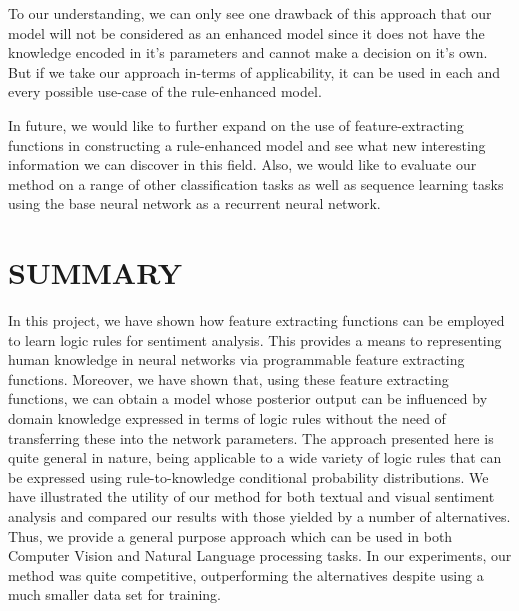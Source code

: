 \documentclass[12pt,a4paper]{article}
\begin{document}
To our understanding, we can only see one drawback of this
approach that our model will not be considered as an enhanced
model since it does not have the knowledge encoded in it’s
parameters and cannot make a decision on it’s own. But if we
take our approach in-terms of applicability, it can be used in
each and every possible use-case of the rule-enhanced model.
\vspace{2mm}

In future, we would like to further expand on the use of feature-extracting functions in constructing a rule-enhanced model and see what new interesting information we can discover in this
field. Also, we would like to evaluate our method on a range
of other classification tasks as well as sequence learning tasks
using the base neural network as a recurrent neural network.

\newpage
\section{\uppercase{summary}}
In this project, we have shown how feature extracting functions can be employed to learn logic rules for sentiment analysis. This provides a means to representing human knowledge in neural networks via programmable feature extracting functions. Moreover,  we have shown that, using these feature extracting functions, we can obtain a model whose posterior output can be influenced by domain knowledge expressed in terms of logic rules without the need of transferring these into the network parameters. The approach presented here is quite general in nature, being applicable to a wide variety of logic rules that can be expressed using rule-to-knowledge conditional probability distributions. We have illustrated the utility of our method for both textual and visual sentiment analysis and compared our results with those yielded by a number of alternatives. Thus, we provide a general purpose approach which can be used in both Computer Vision and Natural Language processing tasks. In our experiments, our method was quite competitive, outperforming the alternatives despite using a much smaller data set for training.
\vspace{2mm}

\newpage


\end{document}
